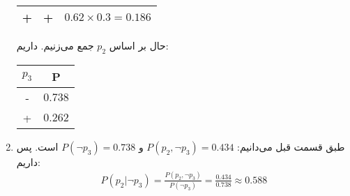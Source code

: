 \begin{enumerate}
\begin{latin}
\begin{tabular}{|c|c|c|}
            \hline
            + & + & $0.62 \times 0.3 = 0.186$\\
            \hline
        \end{tabular}
    \end{latin}
    حال بر اساس
    $p_2$
    جمع می‌زنیم. داریم:
    \begin{latin}
        \centering
        \begin{tabular}{|c|c|}
            \hline
            $p_3$ & P\\
            \hline
            - & $0.738$\\
            \hline
            + & $0.262$\\
            \hline
        \end{tabular}
    \end{latin}
    \item طبق قسمت قبل می‌دانیم:
    $P(p_2, \neg p_3) = 0.434$
    و
    $P(\neg p_3) = 0.738$
    است.
    پس داریم:
    \begin{gather*}
        P(p_2 | \neg p_3) = \frac{P(p_2, \neg p_3)}{P(\neg p_3)} = \frac{0.434}{0.738} \approx 0.588
    \end{gather*}
\end{enumerate}